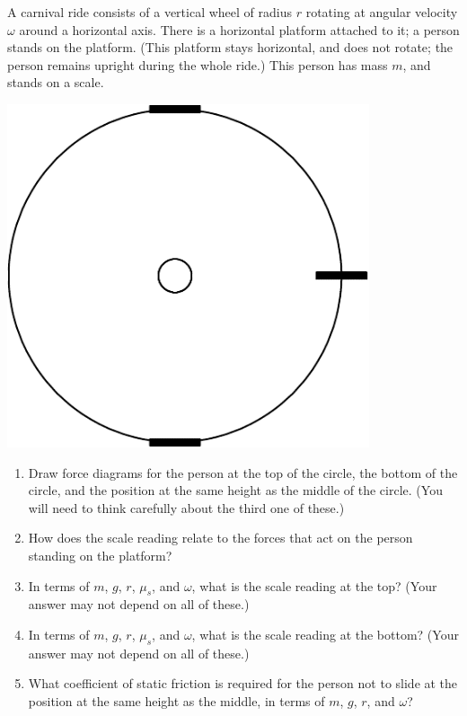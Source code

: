 \documentclass[12pt]{article}
\begin{document}
\begin{enumerate}
\begin{minipage}[t]{0.6\textwidth}
	A carnival ride consists of a vertical wheel of radius $r$ rotating at angular velocity $\omega$ around a
	horizontal axis. There is a horizontal platform attached to it; a person stands on the platform. (This platform
	stays horizontal, and does not rotate; the person remains upright during the whole ride.) This
	person has mass $m$, and stands on a scale.
\end{minipage}
\begin{minipage}{0.35\textwidth}
	\vspace{0.8in}
	\begin{center}
		\includegraphics[width=0.8\textwidth]{wheel-crop.pdf}
	\end{center}
\end{minipage}

\begin{enumerate}
	\item Draw force diagrams for the person at the top of the circle, the bottom of the circle, and the position at the 
	same height as the middle of the circle. (You will need to think carefully about the third one of these.)
	\item How does the scale reading relate to the forces that act on the person standing on the platform?
	\item In terms of $m$, $g$, $r$, $\mu_s$, and $\omega$, what is the scale reading at the top? (Your answer may not depend on all of these.)
	\item In terms of $m$, $g$, $r$, $\mu_s$, and $\omega$, what is the scale reading at the bottom? (Your answer may not depend on all of these.)
	\item What coefficient of static friction is required for the person not to slide at the position at the same height as the middle, in terms of $m$, $g$, $r$, and $\omega$?
\end{enumerate}


\end{enumerate}
\end{document}
